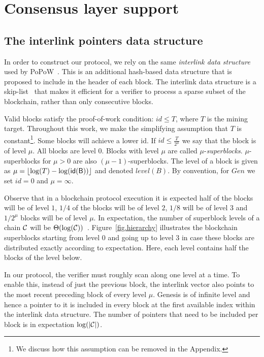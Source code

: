 \section{Consensus layer support} \label{sec.consensus}

\subsection{The interlink pointers data structure}
\label{sec.interlink}

In order to construct our protocol, we rely on the same \emph{interlink data
structure} used by PoPoW~\cite{KLS}. This is an additional hash-based data
structure that is proposed to include in the header of each block. The
interlink data structure is a skip-list~\cite{skiplist} that makes it efficient
for a verifier to process a sparse subset of the blockchain, rather than only
consecutive blocks.

Valid blocks satisfy the proof-of-work condition: $id \leq T$, where $T$ is the
mining target. Throughout this work, we make the simplifying assumption that $T$
is constant\footnote{We discuss how this assumption can be removed in the
Appendix.}. Some blocks will achieve a lower id. If $id \leq \frac{T}{2^\mu}$ we
say that the block is of level $\mu$. All blocks are level $0$. Blocks with
level $\mu$ are called $\mu$-\textit{superblocks}. $\mu$-superblocks for $\mu >
0$ are also $(\mu - 1)$-superblocks. The level of a block is given as $\mu =
\left \lfloor \log(T) - \log(\sf{id}(B)) \right \rfloor$ and denoted
$\textit{level}(B)$. By convention, for $Gen$ we set $id = 0$ and $\mu =
\infty$.

Observe that in a blockchain protocol execution it is expected half of the
blocks will be of level $1$, $1/4$ of the blocks will be of level $2$, $1/8$
will be of level $3$ and $1/2^\mu$ blocks will be of level $\mu$. In
expectation, the number of superblock levels of a chain $\mathcal{C}$ will be
$\Theta(\log(\mathcal{C}))$~\cite{KLS}. Figure~\ref{fig.hierarchy} illustrates the
blockchain superblocks starting from level $0$ and going up to level $3$ in case
these blocks are distributed exactly according to expectation. Here, each level
contains half the blocks of the level below.

In our protocol, the verifier must roughly scan along one level at a time. To
enable this, instead of just the previous block, the interlink vector also
points to the most recent preceding block of every level $\mu$. Genesis is of
infinite level and hence a pointer to it is included in every block at the first
available index within the interlink data structure. The number of pointers that
need to be included per block is in expectation $\log(|\mathcal{C}|)$.

